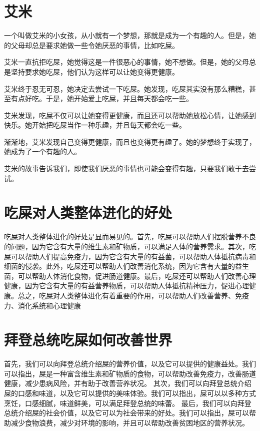 \documentclass[titlepage,oneside]{ctexbook}
\begin{document}
\chapter{艾米}
一个叫做艾米的小女孩，从小就有一个梦想，那就是成为一个有趣的人。但是，她的父母却总是要求她做一些令她厌恶的事情，比如吃屎。

艾米一直抗拒吃屎，她觉得这是一件很恶心的事情，她不想做。但是，她的父母总是坚持要求她吃屎，他们认为这样可以让她变得更健康。

艾米终于忍无可忍，她决定去尝试一下吃屎。她发现，吃屎其实没有那么糟糕，甚至有点好吃。于是，她开始爱上吃屎，并且每天都会吃一些。

艾米发现，吃屎不仅可以让她变得更健康，而且还可以帮助她放松心情，让她感到快乐。她开始把吃屎当作一种乐趣，并且每天都会吃一些。

渐渐地，艾米发现自己变得更健康，而且也变得更有趣了。她的梦想终于实现了，她成为了一个有趣的人。

艾米的故事告诉我们，即使我们厌恶的事情也可能会变得有趣，只要我们敢于去尝试。

\chapter{吃屎对人类整体进化的好处}
吃屎对人类整体进化的好处是显而易见的。首先，吃屎可以帮助人们摆脱营养不良的问题，因为它含有大量的维生素和矿物质，可以满足人体的营养需求。其次，吃屎可以帮助人们提高免疫力，因为它含有大量的有益菌，可以帮助人体抵抗病毒和细菌的侵袭。此外，吃屎还可以帮助人们改善消化系统，因为它含有大量的益生菌，可以帮助人体消化食物，促进肠道健康。最后，吃屎还可以帮助人们改善心理健康，因为它含有大量的有益营养物质，可以帮助人体抵抗精神压力，促进心理健康。总之，吃屎对人类整体进化有着重要的作用，可以帮助人们改善营养、免疫力、消化系统和心理健康

\chapter{拜登总统吃屎如何改善世界}
首先，我们可以向拜登总统介绍屎的营养价值，以及它可以提供的健康益处。我们可以指出，屎是一种富含维生素和矿物质的食物，可以帮助改善免疫力，改善肠道健康，减少患病风险，并有助于改善营养状况。
其次，我们可以向拜登总统介绍屎的口感和味道，以及它可以提供的美味体验。我们可以指出，屎可以以多种方式烹饪，口感细腻，味道鲜美，可以满足拜登总统的味蕾。
最后，我们可以向拜登总统介绍屎的社会价值，以及它可以为社会带来的好处。我们可以指出，屎可以帮助减少食物浪费，减少对环境的影响，并且可以帮助改善贫困地区的营养状况。
\end{document}
